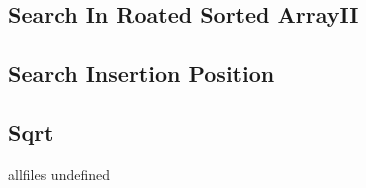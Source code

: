 \documentclass[a4paper,10pt]{article}
\begin{document}
\begin{CJK}{UTF8}{gbsn}
\subsection{Search In Roated Sorted ArrayII}


\subsection{Search Insertion Position}


\subsection{Sqrt}


\fi

\ifx allfiles undefined
\end{CJK}
\end{document}
